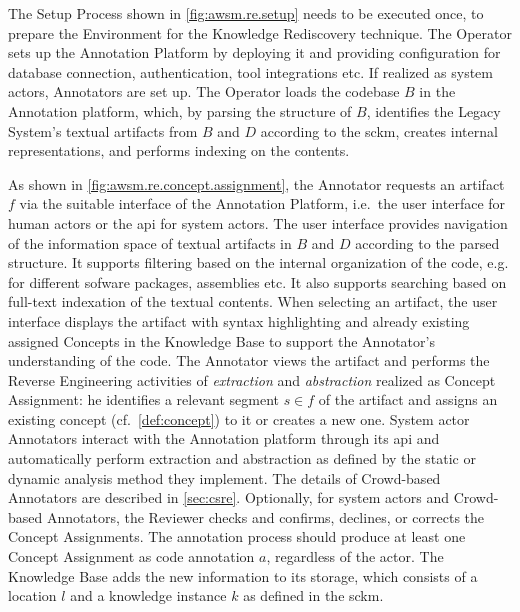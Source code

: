 The Setup Process shown in \cref{fig:awsm.re.setup} needs to be executed once, to prepare the Environment for the Knowledge Rediscovery technique.
The Operator sets up the Annotation Platform by deploying it and providing configuration for database connection, authentication, tool integrations etc. 
If realized as system actors, Annotators are set up.
The Operator loads the codebase \(B\) in the Annotation platform, which, by parsing the structure of \(B\), identifies the \gls{Legacy System}'s textual \glspl{artifact} from \(B\) and \(D\) according to the \gls{sckm}, creates internal representations, and performs indexing on the contents.

As shown in \cref{fig:awsm.re.concept.assignment}, the Annotator requests an \gls{artifact} \(f\) via the suitable interface of the Annotation Platform, i.e.~the user interface for human actors or the \gls{api} for system actors.
The user interface provides navigation of the information space of textual \glspl{artifact} in \(B\) and \(D\) according to the parsed structure.
It supports filtering based on the internal organization of the code, e.g. for different sofware packages, assemblies etc.
It also supports searching based on full-text indexation of the textual contents.
When selecting an \gls{artifact}, the user interface displays the \gls{artifact} with syntax highlighting and already existing assigned \glspl{Concept} in the Knowledge Base to support the Annotator's understanding of the code.
The Annotator views the \gls{artifact} and performs the \gls{Reverse Engineering} activities of \emph{extraction} and \emph{abstraction} realized as \gls{Concept Assignment}: he identifies a relevant segment \(s \in f\) of the \gls{artifact} and assigns an existing concept (cf.~\cref{def:concept}) to it or creates a new one.
System actor Annotators interact with the Annotation platform through its \gls{api} and automatically perform extraction and abstraction as defined by the static or dynamic analysis method they implement.
The details of Crowd-based Annotators are described in \cref{sec:csre}.
Optionally, for system actors and Crowd-based Annotators, the Reviewer checks and confirms, declines, or corrects the \glspl{Concept Assignment}.
The annotation process should produce at least one \gls{Concept Assignment} as code annotation \(a\), regardless of the actor.
The Knowledge Base adds the new information to its storage, which consists of a location \(l\) and a knowledge instance \(k\) as defined in the \gls{sckm}.

